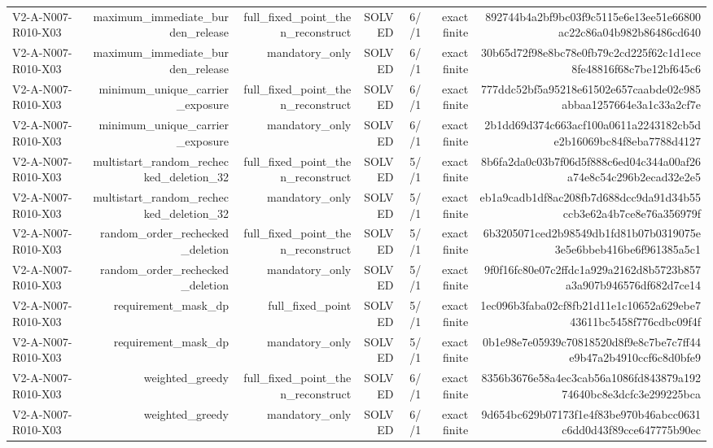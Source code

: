 {\begin{longtable}{lrrrrrr}
V2-A-N007-R010-X03 & maximum\_immediate\_burden\_release & full\_fixed\_point\_then\_reconstruct & SOLVED & 6//1 & exact finite & 892744b4a2bf9bc03f9c5115e6e13ee51e66800ac22c86a04b982b86486cd640 \\
V2-A-N007-R010-X03 & maximum\_immediate\_burden\_release & mandatory\_only & SOLVED & 6//1 & exact finite & 30b65d72f98e8bc78e0fb79c2cd225f62c1d1ece8fe48816f68c7be12bf645c6 \\
V2-A-N007-R010-X03 & minimum\_unique\_carrier\_exposure & full\_fixed\_point\_then\_reconstruct & SOLVED & 6//1 & exact finite & 777ddc52bf5a95218e61502e657caabde02c985abbaa1257664e3a1c33a2cf7e \\
V2-A-N007-R010-X03 & minimum\_unique\_carrier\_exposure & mandatory\_only & SOLVED & 6//1 & exact finite & 2b1dd69d374c663acf100a0611a2243182cb5de2b16069bc84f8eba7788d4127 \\
V2-A-N007-R010-X03 & multistart\_random\_rechecked\_deletion\_32 & full\_fixed\_point\_then\_reconstruct & SOLVED & 5//1 & exact finite & 8b6fa2da0c03b7f06d5f888c6ed04c344a00af26a74e8c54c296b2ecad32e2e5 \\
V2-A-N007-R010-X03 & multistart\_random\_rechecked\_deletion\_32 & mandatory\_only & SOLVED & 5//1 & exact finite & eb1a9cadb1df8ac208fb7d688dcc9da91d34b55ccb3e62a4b7ce8e76a356979f \\
V2-A-N007-R010-X03 & random\_order\_rechecked\_deletion & full\_fixed\_point\_then\_reconstruct & SOLVED & 5//1 & exact finite & 6b3205071ced2b98549db1fd81b07b0319075e3e5e6bbeb416be6f961385a5c1 \\
V2-A-N007-R010-X03 & random\_order\_rechecked\_deletion & mandatory\_only & SOLVED & 5//1 & exact finite & 9f0f16fc80e07c2ffdc1a929a2162d8b5723b857a3a907b946576df682d7ce14 \\
V2-A-N007-R010-X03 & requirement\_mask\_dp & full\_fixed\_point & SOLVED & 5//1 & exact finite & 1ec096b3faba02cf8fb21d11e1c10652a629ebe743611bc5458f776cdbc09f4f \\
V2-A-N007-R010-X03 & requirement\_mask\_dp & mandatory\_only & SOLVED & 5//1 & exact finite & 0b1e98e7e05939c70818520d8f9e8c7be7c7ff44e9b47a2b4910ccf6c8d0bfe9 \\
V2-A-N007-R010-X03 & weighted\_greedy & full\_fixed\_point\_then\_reconstruct & SOLVED & 6//1 & exact finite & 8356b3676e58a4ec3cab56a1086fd843879a19274640bc8e3dcfc3e299225bca \\
V2-A-N007-R010-X03 & weighted\_greedy & mandatory\_only & SOLVED & 6//1 & exact finite & 9d654bc629b07173f1e4f83be970b46abcc0631c6dd0d43f89cce647775b90ec \\

\end{longtable}}
